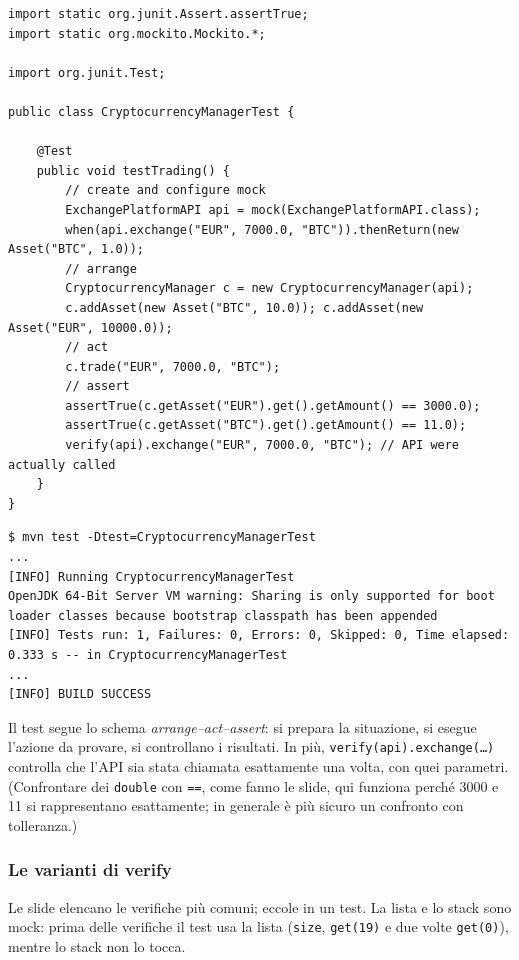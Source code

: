 \begin{lstlisting}[style=java, name=CryptocurrencyManagerTest.java]
import static org.junit.Assert.assertTrue;
import static org.mockito.Mockito.*;

import org.junit.Test;

public class CryptocurrencyManagerTest {

    @Test
    public void testTrading() {
        // create and configure mock
        ExchangePlatformAPI api = mock(ExchangePlatformAPI.class);
        when(api.exchange("EUR", 7000.0, "BTC")).thenReturn(new Asset("BTC", 1.0));
        // arrange
        CryptocurrencyManager c = new CryptocurrencyManager(api);
        c.addAsset(new Asset("BTC", 10.0)); c.addAsset(new Asset("EUR", 10000.0));
        // act
        c.trade("EUR", 7000.0, "BTC");
        // assert
        assertTrue(c.getAsset("EUR").get().getAmount() == 3000.0);
        assertTrue(c.getAsset("BTC").get().getAmount() == 11.0);
        verify(api).exchange("EUR", 7000.0, "BTC"); // API were actually called
    }
}
\end{lstlisting}

\begin{lstlisting}[style=shell, name=Terminale]
$ mvn test -Dtest=CryptocurrencyManagerTest
...
[INFO] Running CryptocurrencyManagerTest
OpenJDK 64-Bit Server VM warning: Sharing is only supported for boot loader classes because bootstrap classpath has been appended
[INFO] Tests run: 1, Failures: 0, Errors: 0, Skipped: 0, Time elapsed: 0.333 s -- in CryptocurrencyManagerTest
...
[INFO] BUILD SUCCESS
\end{lstlisting}

Il test segue lo schema \textit{arrange--act--assert}: si prepara la situazione, si esegue l'azione da provare, si
controllano i risultati. In più, \texttt{verify(api).exchange(\ldots)} controlla che l'API sia stata chiamata esattamente
una volta, con quei parametri. (Confrontare dei \texttt{double} con \texttt{==}, come fanno le slide, qui funziona perché
3000 e 11 si rappresentano esattamente; in generale è più sicuro un confronto con tolleranza.)

\subsubsection*{Le varianti di verify}

Le slide elencano le verifiche più comuni; eccole in un test. La lista e lo stack sono mock: prima delle verifiche il
test usa la lista (\texttt{size}, \texttt{get(19)} e due volte \texttt{get(0)}), mentre lo stack non lo tocca.

